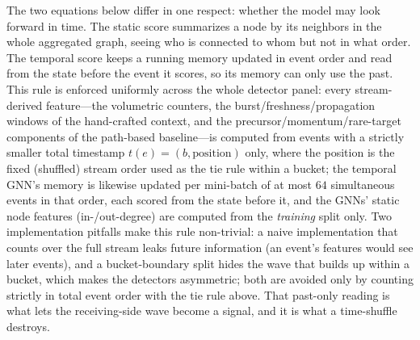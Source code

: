 \smallskip The two equations below differ in one respect: whether the model may
look forward in time. The static score summarizes a node by its neighbors in the whole aggregated graph, seeing
who is connected to whom but not in what order. The temporal score keeps a running memory updated
in event order and read from the state before the event it scores, so its memory can only use the past.
This rule is enforced uniformly across the whole detector panel: every stream-derived
feature---the volumetric counters, the burst/freshness/propagation windows of the hand-crafted context,
and the precursor/momentum/rare-target components of the path-based baseline---is computed from events
with a strictly smaller total timestamp $t(e)=(b,\text{position})$ only, where the position is the fixed
(shuffled) stream order used as the tie rule within a bucket; the temporal GNN's memory is likewise
updated per mini-batch of at most $64$ simultaneous events in that order, each scored from the state
before it, and the GNNs' static node features (in-/out-degree) are computed from the
\emph{training} split only. Two implementation pitfalls make this rule non-trivial: a naive
implementation that counts over the full stream leaks future information (an event's features would see
later events), and a bucket-boundary split hides the wave that builds up within a bucket, which makes the
detectors asymmetric; both are avoided only by counting strictly in total event order with the tie rule
above. That past-only
reading is what lets the receiving-side wave become a signal, and it is what a time-shuffle destroys.

